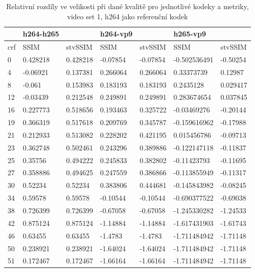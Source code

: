 \documentclass[thesis=M,czech]{FITthesis}[2016/06/26]
\begin{document}
\begin{table}[]
\centering
\begin{tabular}{|l|l|l|l|l|l|l|}
\hline
    & h264-h265 &          & h264-vp9 &          & h265-vp9     &          \\ \hline
crf & SSIM      & stvSSIM  & SSIM     & stvSSIM  & SSIM         & stvSSIM  \\ \hline
0   & 0.428218  & 0.428218 & -0.07854 & -0.07854 & -0.502536491 & -0.50254 \\ \hline
4   & -0.06921  & 0.137381 & 0.266064 & 0.266064 & 0.33373739   & 0.12987  \\ \hline
8   & -0.061    & 0.153983 & 0.183193 & 0.183193 & 0.2435128    & 0.029417 \\ \hline
12  & -0.03439  & 0.212548 & 0.249891 & 0.249891 & 0.283674654  & 0.037845 \\ \hline
16  & 0.227773  & 0.518656 & 0.193463 & 0.325722 & -0.03469276  & -0.20144 \\ \hline
19  & 0.366319  & 0.517618 & 0.209769 & 0.345787 & -0.159616962 & -0.17988 \\ \hline
21  & 0.212933  & 0.513082 & 0.228202 & 0.421195 & 0.015456786  & -0.09713 \\ \hline
23  & 0.362748  & 0.502461 & 0.243296 & 0.389886 & -0.122147118 & -0.11837 \\ \hline
25  & 0.35756   & 0.494222 & 0.245833 & 0.382802 & -0.11423793  & -0.11695 \\ \hline
27  & 0.358886  & 0.494625 & 0.247559 & 0.386866 & -0.113855949 & -0.11317 \\ \hline
30  & 0.52234   & 0.52234  & 0.383806 & 0.444681 & -0.145843982 & -0.08245 \\ \hline
34  & 0.59578   & 0.59578  & -0.10544 & -0.10544 & -0.690377522 & -0.69038 \\ \hline
38  & 0.726399  & 0.726399 & -0.67058 & -0.67058 & -1.245330282 & -1.24533 \\ \hline
42  & 0.875124  & 0.875124 & -1.14884 & -1.14884 & -1.617431903 & -1.61743 \\ \hline
46  & 0.63455   & 0.63455  & -1.4783  & -1.4783  & -1.711484942 & -1.71148 \\ \hline
50  & 0.238921  & 0.238921 & -1.64024 & -1.64024 & -1.711484942 & -1.71148 \\ \hline
51  & 0.172467  & 0.172467 & -1.66164 & -1.66164 & -1.711484942 & -1.71148 \\ \hline
\end{tabular}
\caption{Relativní rozdíly ve velikosti při dané kvalitě pro jednotlivé kodeky a metriky, video set 1, h264 jako referenční kodek}
\label{data_1_diff_h264}
\end{table}
\end{document}
